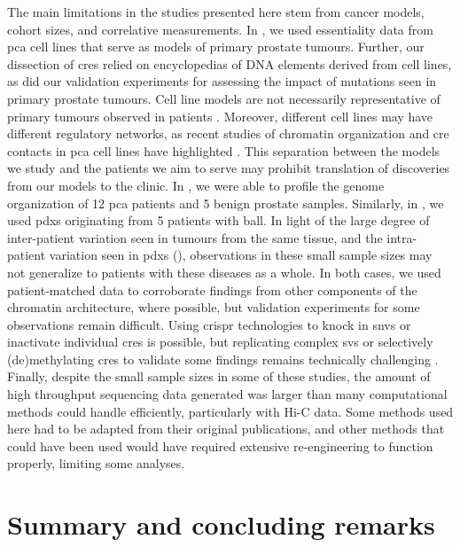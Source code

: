 The main limitations in the studies presented here stem from cancer models, cohort sizes, and correlative measurements.
In , we used essentiality data from \gls{pca} cell lines that serve as models of primary prostate tumours.
Further, our dissection of \glspl{cre} relied on encyclopedias of DNA elements derived from cell lines, as did our validation experiments for assessing the impact of mutations seen in primary prostate tumours.
Cell line models are not necessarily representative of primary tumours observed in patients \cite{}.
Moreover, different cell lines may have different regulatory networks, as recent studies of chromatin organization and \gls{cre} contacts in \gls{pca} cell lines have highlighted \cite{ahmedCRISPRiScreensReveal2021}.
This separation between the models we study and the patients we aim to serve may prohibit translation of discoveries from our models to the clinic.
In , we were able to profile the genome organization of 12 \gls{pca} patients and 5 benign prostate samples.
Similarly, in , we used \glspl{pdx} originating from 5 patients with \gls{ball}.
In light of the large degree of inter-patient variation seen in tumours from the same tissue, and the intra-patient variation seen in \glspl{pdx} (), observations in these small sample sizes may not generalize to patients with these diseases as a whole.
In both cases, we used patient-matched data to corroborate findings from other components of the chromatin architecture, where possible, but validation experiments for some observations remain difficult.
Using \gls{crispr} technologies to knock in \glspl{snv} or inactivate individual \glspl{cre} is possible, but replicating complex \glspl{sv} or selectively (de)methylating \glspl{cre} to validate some findings remains technically challenging \cite{nakamuraCRISPRTechnologiesPrecise2021,pickar-oliverNextGenerationCRISPR2019,wangEngineering3DGenome2021}.
Finally, despite the small sample sizes in some of these studies, the amount of high throughput sequencing data generated was larger than many computational methods could handle efficiently, particularly with Hi-C data.
Some methods used here had to be adapted from their original publications, and other methods that could have been used would have required extensive re-engineering to function properly, limiting some analyses.

\section{Summary and concluding remarks}

